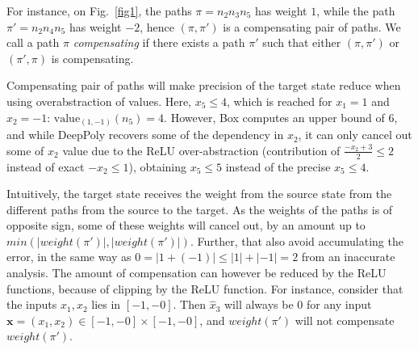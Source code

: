 \documentclass{llncs}
\newcommand{\vx}{\boldsymbol{x}}
\newcommand{\val}{{\textrm{value}}}
\begin{document}
For instance, on Fig.~\ref{fig1}, the paths $\pi= n_2 n_3 n_5$ has weight $1$, while the
path $\pi'= n_2 n_4 n_5$ has weight $-2$, hence $(\pi,\pi')$ is a compensating pair of paths.
We call a path $\pi$ {\em compensating} if there exists a path $\pi'$ such that either $(\pi,\pi')$ or $(\pi',\pi)$ is compensating.

Compensating pair of paths will make precision of the target state reduce when using overabstraction of values. Here, $x_5 \leq 4$, which is reached for $x_1=1$ and $x_2=-1$: 
$\val_{(1,-1)}(n_5)=4$. However, Box computes an upper bound of $6$, and while DeepPoly recovers some of the dependency in $x_2$, it can only cancel out some of $x_2$ value due to the ReLU over-abstraction (contribution of $\frac{-x_2+3}{2} \leq 2$ instead of exact $-x_2 \leq 1$), obtaining $x_5 \leq 5$ instead of the precise $x_5 \leq 4$.

Intuitively, the target state receives the weight from the source state from the different paths from the source to the target. As the weights of the paths is of opposite sign, some of these weights will cancel out, by an amount up to $min(|weight(\pi')|,|weight(\pi')|)$. 
Further, that also avoid accumulating the error, in the same way as $0= |1+(-1)| \leq |1|+|-1|=2$ from an inaccurate analysis. The amount of compensation can however be reduced by the ReLU functions, because of clipping by the ReLU function. For instance, consider that the inputs $x_1,x_2$ lies in $[-1,-0]$. Then $\hat{x}_3$ will always be 0 for any input $\vx=(x_1,x_2) \in [-1,-0] \times [-1,-0]$, and $weight(\pi')$ will not compensate $weight(\pi')$.




\iffalse
\vspace*{2ex}
\end{document}
